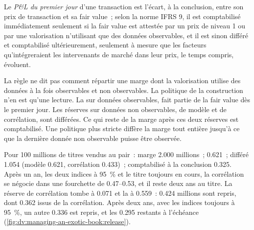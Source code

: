 \begin{definition}\label{def:dv:managing-an-exotic-book:dayone}
Le \emph{P\&L du premier jour} d'une transaction est l'écart, à la conclusion, entre son prix de transaction et sa fair value~; selon la norme IFRS 9, il est
comptabilisé immédiatement seulement si la fair value est attestée par un prix de niveau 1 ou par une valorisation n'utilisant que des données observables, et il est sinon différé et comptabilisé
ultérieurement, seulement à mesure que les facteurs qu'intégreraient les intervenants de marché dans leur prix, le temps compris, évoluent.
\end{definition}

La règle ne dit pas comment répartir une marge dont la valorisation utilise des données à la fois observables et non observables. La politique de la construction n'en est qu'une lecture. La 
sur données observables, fait partie de la fair value dès le premier jour. Les réserves sur données non observables, de modèle et de corrélation, sont différées. Ce qui reste de la
marge après ces deux réserves est comptabilisé. Une politique plus stricte diffère la marge tout entière jusqu'à ce que la dernière donnée non observable puisse être observée.

\begin{example}\label{ex:dv:managing-an-exotic-book:dayone}
Pour 100 millions de titres vendus au pair~: marge 2.000 millions~;  0.621~; différé 1.054 (modèle 0.621, corrélation 0.433)~; comptabilisé à la conclusion
0.325. Après un an, les deux indices à 95~\% et le titre toujours en cours, la corrélation se négocie dans une fourchette de 0.47--0.53, et il reste deux ans au titre. La réserve
de corrélation tombe à 0.071 et la  à 0.559~: 0.424 millions sont repris, dont 0.362 issus de la corrélation. Après deux ans, avec les indices toujours à 95~\%,
un autre 0.336 est repris, et les 0.295 restants à l'échéance (\cref{fig:dv:managing-an-exotic-book:release}).
\end{example}

